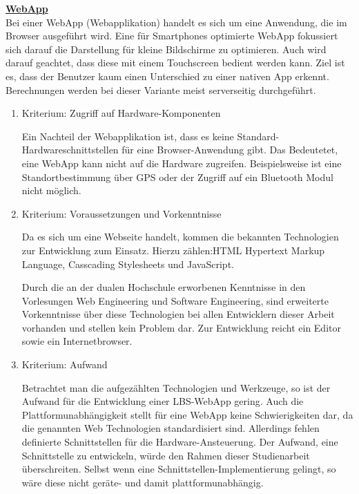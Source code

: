 \textbf{\underline{WebApp}}\\
Bei einer WebApp (Webapplikation) handelt es sich um eine Anwendung, die im 
Browser ausgeführt wird. Eine für Smartphones optimierte WebApp fokussiert sich 
darauf die Darstellung für kleine Bildschirme zu optimieren. Auch wird darauf 
geachtet, dass diese mit einem Touchscreen bedient werden kann. Ziel ist es, dass 
der Benutzer kaum einen Unterschied zu einer nativen App erkennt. Berechnungen 
werden bei dieser Variante meist serverseitig durchgeführt. 

\begin{enumerate}
\item Kriterium: Zugriff auf Hardware-Komponenten

Ein Nachteil der Webapplikation ist, dass es keine Standard-Hardwareschnittstellen 
für eine Browser-Anwendung gibt. Das Bedeutetet, eine WebApp kann nicht auf die 
Hardware zugreifen. Beispielsweise ist eine Standortbestimmung über GPS oder der 
Zugriff auf ein Bluetooth Modul nicht möglich.

\item Kriterium: Voraussetzungen und Vorkenntnisse

Da es sich um eine Webseite handelt, kommen die bekannten Technologien zur 
Entwicklung zum Einsatz. Hierzu zählen:HTML Hypertext Markup Language, Casscading 
Stylesheets und JavaScript.

Durch die an der dualen Hochschule erworbenen Kenntnisse in den Vorlesungen Web 
Engineering und Software Engineering, sind erweiterte Vorkenntnisse über diese 
Technologien bei allen Entwicklern dieser Arbeit vorhanden und stellen kein Problem 
dar. Zur Entwicklung reicht ein Editor sowie ein Internetbrowser. 

\item Kriterium: Aufwand

Betrachtet man die aufgezählten Technologien und Werkzeuge, so ist der Aufwand für 
die Entwicklung einer LBS-WebApp gering. Auch die Plattformunabhängigkeit stellt 
für eine WebApp keine Schwierigkeiten dar, da die genannten Web Technologien 
standardisiert sind. Allerdings fehlen definierte Schnittstellen für die Hardware-Ansteuerung. Der Aufwand, eine Schnittstelle zu entwickeln, würde den Rahmen dieser 
Studienarbeit überschreiten. Selbst wenn eine Schnittstellen-Implementierung 
gelingt, so wäre diese nicht geräte- und damit plattformunabhängig.
\end{enumerate}


